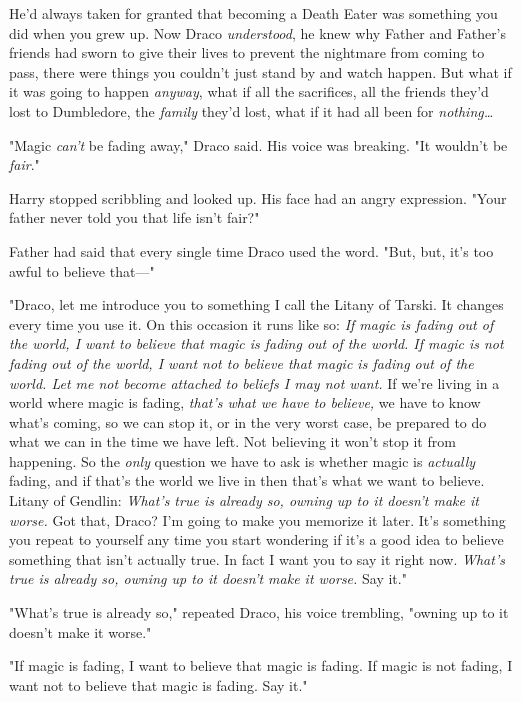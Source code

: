 He'd always taken for granted that becoming a Death Eater was something you did 
when you grew up. Now Draco \emph{understood}, he knew why Father and Father's 
friends had sworn to give their lives to prevent the nightmare from coming to 
pass, there were things you couldn't just stand by and watch happen. But what 
if it was going to happen \emph{anyway}, what if all the sacrifices, all the 
friends they'd lost to Dumbledore, the \emph{family} they'd lost, what if it 
had all been for \emph{nothing{\ldots}}

"Magic \emph{can't} be fading away," Draco said. His voice was breaking. "It 
wouldn't be \emph{fair}."

Harry stopped scribbling and looked up. His face had an angry expression. "Your 
father never told you that life isn't fair?"

Father had said that every single time Draco used the word. "But, but, it's too 
awful to believe that---"

"Draco, let me introduce you to something I call the Litany of Tarski. It 
changes every time you use it. On this occasion it runs like so: \emph{If magic 
is fading out of the world, I want to believe that magic is fading out of the 
world. If magic is not fading out of the world, I want not to believe that 
magic is fading out of the world. Let me not become attached to beliefs I may 
not want.} If we're living in a world where magic is fading, \emph{that's what 
we have to believe,} we have to know what's coming, so we can stop it, or in 
the very worst case, be prepared to do what we can in the time we have left. 
Not believing it won't stop it from happening. So the \emph{only} question we 
have to ask is whether magic is \emph{actually} fading, and if that's the world 
we live in then that's what we want to believe. Litany of Gendlin: \emph{What's 
true is already so, owning up to it doesn't make it worse.} Got that, Draco? 
I'm going to make you memorize it later. It's something you repeat to yourself 
any time you start wondering if it's a good idea to believe something that 
isn't actually true. In fact I want you to say it right now. \emph{What's true 
is already so, owning up to it doesn't make it worse.} Say it."

"What's true is already so," repeated Draco, his voice trembling, "owning up to 
it doesn't make it worse."

"If magic is fading, I want to believe that magic is fading. If magic is not 
fading, I want not to believe that magic is fading. Say it."

